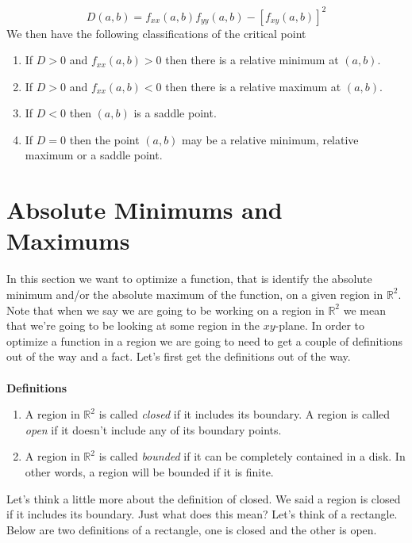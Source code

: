\documentclass[10pt,reqno]{book}
\theoremstyle{definition}
\def\R{\mathbb{R}}
\begin{document}
	\[ D(a,b) = f_{xx}(a,b)f_{yy}(a,b) - \left[ f_{xy}(a,b) \right]^2 \]
	We then have the following classifications of the critical point
	\begin{enumerate}
		\item If $ D > 0 $ and $ f_{xx}(a,b) > 0 $ then there is a relative minimum at $ (a,b) $.
		\item If $ D > 0 $ and $ f_{xx}(a,b) < 0 $ then there is a relative maximum at $ (a,b) $.
		\item If $ D < 0 $ then $ (a,b) $ is a saddle point.
		\item If $ D = 0 $ then the point $ (a,b) $ may be a relative minimum, relative maximum or a saddle point.
	\end{enumerate}

	
	\section{Absolute Minimums and Maximums}
	
	In this section we want to optimize a function, that is identify the absolute minimum and/or the absolute maximum of the function, on a given region in $ \R^2 $. Note that when we say we are going to be working on a region in $ \R^2 $ we mean that we're going to be looking at some region in the $ xy $-plane. In order to optimize a function in a region we are going to need to get a couple of definitions out of the way and a fact. Let's first get the definitions out of the way.\\ \\
	\textbf{Definitions}
	\begin{enumerate}
		\item A region in $ \R^2 $ is called \textit{closed} if it includes its boundary. A region is called \textit{open} if it doesn't include any of its boundary points.
		\item A region in $ \R^2 $ is called \textit{bounded} if it can be completely contained in a disk. In other words, a region will be bounded if it is finite.
	\end{enumerate}
	Let's think a little more about the definition of closed. We said a region is closed if it includes its boundary. Just what does this mean? Let's think of a rectangle. Below are two definitions of a rectangle, one is closed and the other is open.
	
\end{document}
